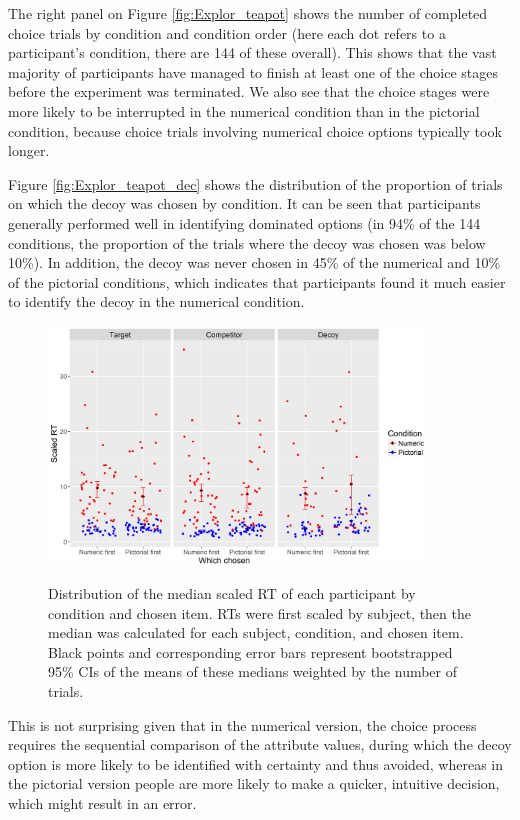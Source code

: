 \documentclass[11pt,a4paper]{article}
\begin{document}
The right panel on Figure \ref{fig:Explor_teapot} shows the number of completed choice trials by condition and condition order (here each dot refers to a participant's condition, there are 144 of these overall). This shows that the vast majority of participants have managed to finish at least one of the choice stages before the experiment was terminated. We also see that the choice stages were more likely to be interrupted in the numerical condition than in the pictorial condition, because choice trials involving numerical choice options typically took longer.



Figure \ref{fig:Explor_teapot_dec} shows the distribution of the proportion of trials on which the decoy was chosen by condition. It can be seen that participants generally performed well in identifying dominated options (in 94\% of the 144 conditions, the proportion of the trials where the decoy was chosen was below 10\%). In addition, the decoy was never chosen in 45\% of the numerical and 10\% of the pictorial conditions, which indicates that participants found it much easier to identify the decoy in the numerical condition.


 \begin{figure}
\centering
\captionsetup{justification=centering,margin=2cm}
\caption{Distribution of the median scaled RT of each participant by condition and chosen item. RTs were first scaled by subject, then the median was calculated for each subject, condition, and chosen item. Black points and corresponding error bars represent bootstrapped 95\% CIs of the means of these medians weighted by the number of trials.}
\includegraphics[width=0.9\textwidth]{Teapot_rts.png}
\label{fig:Teapot_rts}
\end{figure} 

 This is not surprising given that in the numerical version, the choice process requires the sequential comparison of the attribute values, during which the decoy option is more likely to be identified with certainty and thus avoided, whereas in the pictorial version people are more likely to make a quicker, intuitive decision, which might result in an error. 
 
\end{document}
